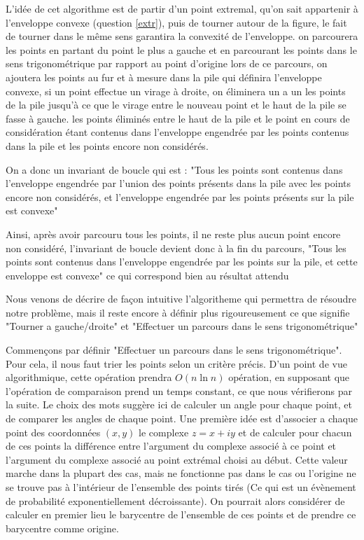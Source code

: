 \documentclass[a4paper,12pt,twoside]{article}
\begin{document}
		L'idée de cet algorithme est de partir d'un point extremal, qu'on sait appartenir à l'enveloppe convexe (question \ref{extr}), puis de tourner autour de la figure, le fait de tourner dans le même sens garantira la convexité de l'enveloppe. on parcourera les points en partant du point le plus a gauche et en parcourant les points dans le sens trigonométrique par rapport au point d'origine lors de ce parcours, on ajoutera les points au fur et à mesure dans la pile qui définira l'enveloppe convexe, si un point effectue un virage à droite, on éliminera un a un les points de la pile jusqu'à ce que le virage entre le nouveau point et le haut de la pile se fasse à gauche. les points éliminés entre le haut de la pile et le point en cours de considération étant contenus dans l'enveloppe engendrée par les points contenus dans la pile et les points encore non considérés.  

		On a donc un invariant de boucle qui est : "Tous les points sont contenus dans l'enveloppe engendrée par l'union des points présents dans la pile avec les points encore non considérés, et l'enveloppe engendrée par les points présents sur la pile est convexe" 

		Ainsi, après avoir parcouru tous les points, il ne reste plus aucun point encore non considéré, l'invariant de boucle devient donc à la fin du parcours, "Tous les points sont contenus dans l'enveloppe engendrée par les points sur la pile, et cette enveloppe est convexe" ce qui correspond bien au résultat attendu

		Nous venons de décrire de façon intuitive l'algoritheme qui permettra de résoudre notre problème, mais il reste encore à définir plus rigoureusement ce que signifie "Tourner a gauche/droite" et "Effectuer un parcours dans le sens trigonométrique"

		Commençons par définir "Effectuer un parcours dans le sens trigonométrique". Pour cela, il nous faut trier les points selon un critère précis. D'un point de vue algorithmique, cette opération prendra $O(n\ln n)$ opération, en supposant que l'opération de comparaison prend un temps constant, ce que nous vérifierons par la suite. Le choix des mots suggère ici de calculer un angle pour chaque point, et de comparer les angles de chaque point. Une première idée est d'associer a chaque point des coordonnées $(x, y)$ le complexe $z = x + iy$ et de calculer pour chacun de ces points la différence entre l'argument du complexe associé à ce point et l'argument du complexe associé au point extrémal choisi au début. Cette valeur marche dans la plupart des cas, mais ne fonctionne pas dans le cas ou l'origine ne se trouve pas à l'intérieur de l'ensemble des points tirés (Ce qui est un évènement de probabilité exponentiellement décroissante). On pourrait alors considérer de calculer en premier lieu le barycentre de l'ensemble de ces points et de prendre ce barycentre comme origine.
\end{document}
